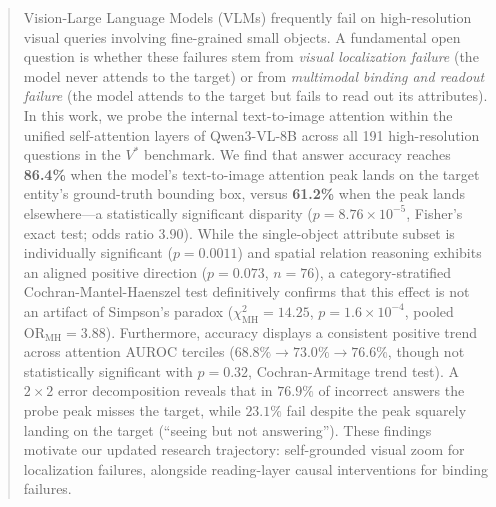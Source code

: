 \documentclass{article}
\begin{document}

\printAffiliationsAndNotice{}

\begin{abstract}
Vision-Large Language Models (VLMs) frequently fail on high-resolution visual queries involving fine-grained small objects. A fundamental open question is whether these failures stem from \textit{visual localization failure} (the model never attends to the target) or from \textit{multimodal binding and readout failure} (the model attends to the target but fails to read out its attributes). In this work, we probe the internal text-to-image attention within the unified self-attention layers of Qwen3-VL-8B across all 191 high-resolution questions in the $V^*$ benchmark. We find that answer accuracy reaches \textbf{86.4\%} when the model's text-to-image attention peak lands on the target entity's ground-truth bounding box, versus \textbf{61.2\%} when the peak lands elsewhere---a statistically significant disparity ($p = 8.76 \times 10^{-5}$, Fisher's exact test; odds ratio $3.90$). While the single-object attribute subset is individually significant ($p = 0.0011$) and spatial relation reasoning exhibits an aligned positive direction ($p = 0.073$, $n=76$), a category-stratified Cochran-Mantel-Haenszel test definitively confirms that this effect is not an artifact of Simpson's paradox ($\chi^2_{\text{MH}} = 14.25$, $p = 1.6 \times 10^{-4}$, pooled $\text{OR}_{\text{MH}} = 3.88$). Furthermore, accuracy displays a consistent positive trend across attention AUROC terciles ($68.8\% \rightarrow 73.0\% \rightarrow 76.6\%$, though not statistically significant with $p = 0.32$, Cochran-Armitage trend test). A $2 \times 2$ error decomposition reveals that in $76.9\%$ of incorrect answers the probe peak misses the target, while $23.1\%$ fail despite the peak squarely landing on the target (``seeing but not answering''). These findings motivate our updated research trajectory: self-grounded visual zoom for localization failures, alongside reading-layer causal interventions for binding failures.
\end{abstract}
\end{document}
